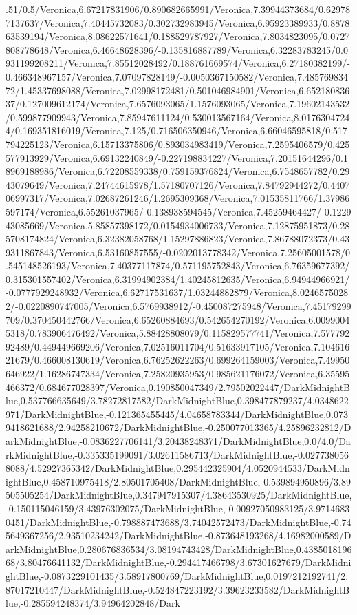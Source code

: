{\begin{tikzternal}
.51/0.5/Veronica,6.67217831906/0.890682665991/Veronica,7.39944373684/0.629787137637/Veronica,7.40445732083/0.302732983945/Veronica,6.95923389933/0.887863539194/Veronica,8.08622571641/0.188529787927/Veronica,7.8034823095/0.0727808778648/Veronica,6.46648628396/-0.135816887789/Veronica,6.32283783245/0.0931199208211/Veronica,7.85512028492/0.188761669574/Veronica,6.27180382199/-0.466348967157/Veronica,7.07097828149/-0.0050367150582/Veronica,7.48576983472/1.45337698088/Veronica,7.02998172481/0.501046984901/Veronica,6.65218083637/0.127009612174/Veronica,7.6576093065/1.1576093065/Veronica,7.19602143532/0.599877909943/Veronica,7.85947611124/0.530013567164/Veronica,8.01763047244/0.169351816019/Veronica,7.125/0.716506350946/Veronica,6.66046595818/0.517794225123/Veronica,6.15713375806/0.893034983419/Veronica,7.2595406579/0.425577913929/Veronica,6.69132240849/-0.227198834227/Veronica,7.20151644296/0.18969188986/Veronica,6.72208559338/0.759159376824/Veronica,6.7548657782/0.2943079649/Veronica,7.24744615978/1.57180707126/Veronica,7.84792944272/0.440706997317/Veronica,7.02687261246/1.2695309368/Veronica,7.01535811766/1.37986597174/Veronica,6.55261037965/-0.138938594545/Veronica,7.45259464427/-0.122943085669/Veronica,5.85857398172/0.0154934006733/Veronica,7.12875951873/0.285708174824/Veronica,6.32382058768/1.15297886823/Veronica,7.86788072373/0.439311867843/Veronica,6.53160857555/-0.0202013778342/Veronica,7.25605001578/0.545148526193/Veronica,7.40377117874/0.571195752843/Veronica,6.76359677392/0.315301557402/Veronica,6.31994902384/1.40245812635/Veronica,6.94944966921/-0.0777929248932/Veronica,6.62717531637/1.03244882879/Veronica,8.02465750282/-0.0220890747005/Veronica,6.5769938912/-0.450087275948/Veronica,7.45179299709/0.370450442766/Veronica,6.65260884693/0.542654270192/Veronica,6.00990045318/0.783906476492/Veronica,5.88428808079/0.115829577741/Veronica,7.57779292489/0.449449669206/Veronica,7.02516011704/0.51633917105/Veronica,7.10461621679/0.466008130619/Veronica,6.76252622263/0.699264159003/Veronica,7.49950646922/1.16286747334/Veronica,7.25820935953/0.985621176072/Veronica,6.35595466372/0.684677028397/Veronica,0.190850047349/2.79502022447/DarkMidnightBlue,0.537766635649/3.78272817582/DarkMidnightBlue,0.398477879237/4.0348622971/DarkMidnightBlue,-0.121365455445/4.04658783344/DarkMidnightBlue,0.0739418621688/2.94258210672/DarkMidnightBlue,-0.250077013365/4.25896232812/DarkMidnightBlue,-0.0836227706141/3.20438248371/DarkMidnightBlue,0.0/4.0/DarkMidnightBlue,-0.335335199091/3.02611586713/DarkMidnightBlue,-0.0277380568088/4.52927365342/DarkMidnightBlue,0.295442325904/4.0520944533/DarkMidnightBlue,0.458710975418/2.80501705408/DarkMidnightBlue,-0.539894950896/3.89505505254/DarkMidnightBlue,0.347947915307/4.38643530925/DarkMidnightBlue,-0.150115046159/3.43976302075/DarkMidnightBlue,-0.00927050983125/3.97146830451/DarkMidnightBlue,-0.798887473688/3.74042572473/DarkMidnightBlue,-0.745649367256/2.93510234242/DarkMidnightBlue,-0.873648193268/4.16982000589/DarkMidnightBlue,0.280676836534/3.08194743428/DarkMidnightBlue,0.438501819668/3.80476641132/DarkMidnightBlue,-0.294417466798/3.67301627679/DarkMidnightBlue,-0.0873229101435/3.58917800769/DarkMidnightBlue,0.0197212192741/2.87017210447/DarkMidnightBlue,-0.524847223192/3.39623233582/DarkMidnightBlue,-0.285594248374/3.94964202848/Dark
\end{tikzternal}}

